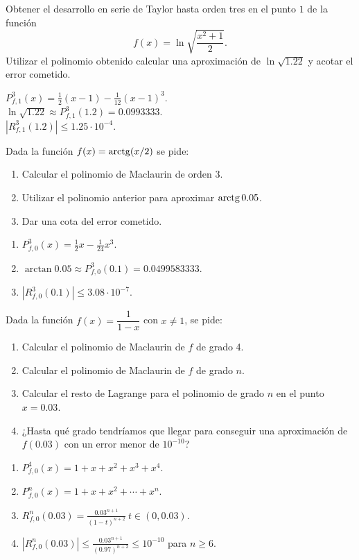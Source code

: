 {Obtener el desarrollo en serie de Taylor hasta orden tres en el punto $1$ de la función
\[f(x) = \ln\sqrt{\dfrac{x^2+1}{2}}.\]
Utilizar el polinomio obtenido calcular una aproximación de $\ln\sqrt{1.22}$ y acotar el error cometido.
}
{$P^3_{f,1}(x) = \frac{1}{2}(x-1)-\frac{1}{12}(x-1)^3$.\\
$\ln\sqrt{1.22} \approx P^3_{f,1}(1.2) = 0.0993333$.\\
$|R^3_{f,1}(1.2)|\leq 1.25\cdot 10^{-4}$.

}
{
}


{Dada la función $f(x)=\operatorname{arctg}(x/2)$ se pide:
\begin{enumerate}
\item Calcular el polinomio de Maclaurin de orden 3.
\item Utilizar el polinomio anterior para aproximar $\operatorname{arctg} 0.05$.
\item Dar una cota del error cometido.
\end{enumerate}
}
{\begin{enumerate}
\item $P^3_{f,0}(x) =  \frac{1}{2}x-\frac{1}{24}x^3$.
\item $\arctan 0.05 \approx P^3_{f,0}(0.1) = 0.0499583333$.
\item $|R^3_{f,0}(0.1)|\leq 3.08\cdot 10^{-7}$.
\end{enumerate}
}
{
}


{Dada la función $f(x)=\dfrac{1}{1-x}$ con $x\neq 1$, se pide:
\begin{enumerate}
\item Calcular el polinomio de Maclaurin de $f$ de grado 4.
\item Calcular el polinomio de Maclaurin de $f$ de grado $n$.
\item Calcular el resto de Lagrange para el polinomio de grado $n$ en el punto $x=0.03$.
\item ¿Hasta qué grado tendríamos que llegar para conseguir una aproximación de $f(0.03)$ con un error menor de $10^{-10}$?
\end{enumerate}
}
{\begin{enumerate}
\item $P^4_{f,0}(x) = 1 + x + x^2 + x^3 + x^4$.
\item $P^n_{f,0}(x) = 1 + x + x^2 + \cdots + x^n$.
\item $R^n_{f,0}(0.03) = \frac{0.03^{n+1}}{(1-t)^{n+2}} \ t\in(0,0.03)$.
\item $|R^n_{f,0}(0.03)| \leq \frac{0.03^{n+1}}{(0.97)^{n+2}}\leq 10^{-10}$ para $n\geq 6$.
\end{enumerate}
}
{
}


